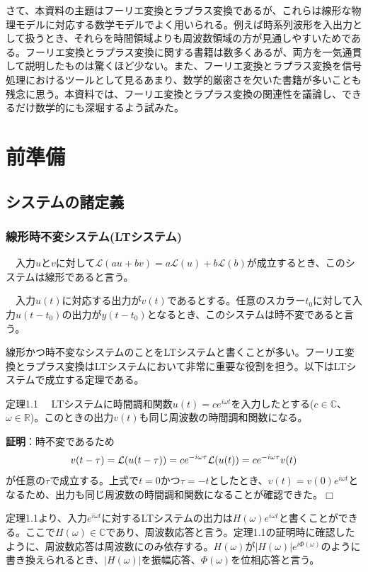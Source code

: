 \documentclass[dvipdfmx, 9pt, a4paper]{jsarticle}
\def\qed{\hfill $\Box$}
\begin{document}
さて、本資料の主題はフーリエ変換とラプラス変換であるが、これらは線形な物理モデルに対応する数学モデルでよく用いられる。例えば時系列波形を入出力として扱うとき、それらを時間領域よりも周波数領域の方が見通しやすいためである。フーリエ変換とラプラス変換に関する書籍は数多くあるが、両方を一気通貫して説明したものは驚くほど少ない。また、フーリエ変換とラプラス変換を信号処理におけるツールとして見るあまり、数学的厳密さを欠いた書籍が多いことも残念に思う。本資料では、フーリエ変換とラプラス変換の関連性を議論し、できるだけ数学的にも深堀するよう試みた。

\section{前準備}
\subsection{システムの諸定義}
\subsubsection{線形時不変システム(LTシステム)}
\begin{tcolorbox}[title=線形システム]
　入力$u$と$v$に対して$\mathcal{L}(au+bv)=a\mathcal{L}(u)+b\mathcal{L}(b)$が成立するとき、このシステムは線形であると言う。
\end{tcolorbox}
\begin{tcolorbox}[title=時不変システム]
　入力$u(t)$に対応する出力が$v(t)$であるとする。任意のスカラー$t_0$に対して入力$u(t-t_0)$の出力が$y(t-t_0)$となるとき、このシステムは時不変であると言う。
\end{tcolorbox}
線形かつ時不変なシステムのことをLTシステムと書くことが多い。フーリエ変換とラプラス変換はLTシステムにおいて非常に重要な役割を担う。以下はLTシステムで成立する定理である。
\begin{itembox}[l]{定理1.1}
　LTシステムに時間調和関数$u(t)=ce^{i\omega t}$を入力したとする($c \in \mathbb{C}$、$\omega \in \mathbb{R}$)。このときの出力$v(t)$も同じ周波数の時間調和関数になる。
\end{itembox}
{\bf 証明}：時不変であるため
\begin{equation}
v(t-\tau)=\mathcal{L}(u(t-\tau))=ce^{-i\omega \tau}\mathcal{L}(u(t))=ce^{-i\omega \tau}v(t) \notag
\end{equation}
が任意の$\tau$で成立する。上式で$t=0$かつ$\tau=-t$としたとき、$v(t)=v(0)e^{i\omega t}$となるため、出力も同じ周波数の時間調和関数になることが確認できた。\qed \par
定理1.1より、入力$e^{i\omega t}$に対するLTシステムの出力は$H(\omega)e^{i\omega t}$と書くことができる。ここで$H(\omega) \in \mathbb{C}$であり、周波数応答と言う。定理1.1の証明時に確認したように、周波数応答は周波数にのみ依存する。$H(\omega)$が$|H(\omega)|e^{i\Phi(\omega)}$のように書き換えられるとき、$|H(\omega)|$を振幅応答、$\Phi(\omega)$を位相応答と言う。
\end{document}
